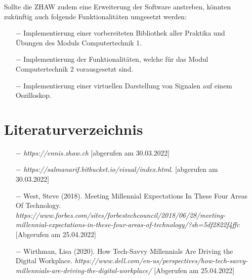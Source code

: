 \documentclass[10pt]{article}
\begin{document}
Sollte die ZHAW zudem eine Erweiterung der Software anstreben, könnten zukünftig auch folgende Funktionalitäten umgesetzt werden: 
\begin{itemize}
\item[$-$] Implementierung einer vorbereiteten Bibliothek aller Praktika und Übungen des Moduls \glqq Computertechnik 1\grqq. 
\item[$-$] Implementierung der Funktionalitäten, welche für das Modul \glqq Computertechnik 2\grqq{} vorausgesetzt sind. 
\item[$-$] Implementierung einer virtuellen Darstellung von Signalen auf einem Oszilloskop.
\end{itemize}

\section{Literaturverzeichnis}

\begin{itemize}

\item[$-$] \emph{https://ennis.zhaw.ch} [abgerufen am 30.03.2022]
\item[$-$] \emph{https://salmanarif.bitbucket.io/visual/index.html}. [abgerufen am 30.03.2022]
\item[$-$] West, Steve (2018). Meeting Millennial Expectations In These Four Areas Of Technology. \emph{https://www.forbes.com/sites/forbestechcouncil/2018/06/28/meeting-millennial-expectations-in-these-four-areas-of-technology/?sh=5df2822f4ffc} [Abgerufen am 25.04.2022]
\item[$-$] Wirthman, Lisa (2020). How Tech-Savvy Millennials Are Driving the Digital Workplace. \emph{https://www.dell.com/en-us/perspectives/how-tech-savvy-millennials-are-driving-the-digital-workplace/} [Abgerufen am 25.04.2022]

\end{itemize}
\end{document}
